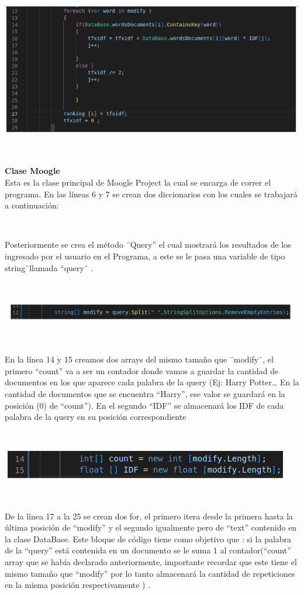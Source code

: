 \documentclass{article}
\begin{document}
{\

\centering
\includegraphics[height = 5.3 cm ]{Captura desde 2023-07-18 23-04-55.png}

\

\textbf{\large Clase Moogle }\\
Esta es la clase principal de Moogle Project  la cual se encarga de correr el programa. En las líneas 6 y 7 se crean dos diccionarios con los cuales se trabajará a continuación:

\

Posteriormente se crea el método ¨Query” el cual mostrará los resultados de los ingresado por el usuario en el Programa, a este se le pasa una variable de tipo string¨llamada “query¨ .

\

\centering
\includegraphics[height = 0.8 cm ]{Captura desde 2023-07-19 10-44-07.png}

\

En la línea 14 y 15 creamos dos arrays del mismo tamaño que ¨modify¨, el primero “count” va a ser un contador donde vamos a guardar la cantidad de documentos en los que aparece 
cada palabra de la query (Ej: Harry Potter… En la cantidad de documentos que se encuentra “Harry”, ese valor se guardará en la posición (0) de “count”). En el segundo “IDF” se 
almacenará los IDF de cada palabra de la query en su posición correspondiente 

\

\centering
\includegraphics[height = 1 cm ]{Captura desde 2023-07-19 10-48-43.png}

\

De la línea 17 a la 25 se crean dos for, el primero itera desde la primera hasta la última posición de “modify” y el segundo igualmente pero de “text” contenido en la clase DataBase. 
Este  bloque de código tiene como objetivo que : si la palabra de la “query” está contenida en un documento se le suma 1 al contador(“count” array que se había declarado anteriormente, 
importante recordar que este  tiene el mismo tamaño  que “modify” por lo tanto almacenará la cantidad de repeticiones en la misma posición respectivamente ) .

}
\end{document}
